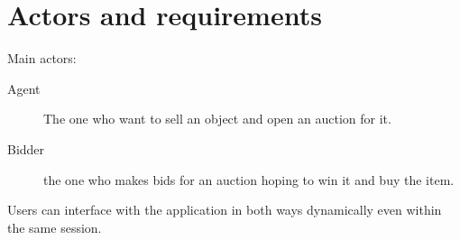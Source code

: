 \chapter{Actors and requirements}\label{ch:requirements}

Main actors:
\begin{description}
	\item[Agent] The one who want to sell an object and open an auction for
		it.
	\item[Bidder] the one who makes bids for an auction hoping to win it and
		buy the item.
\end{description}

Users can interface with the application in both ways dynamically even within
the same session.



